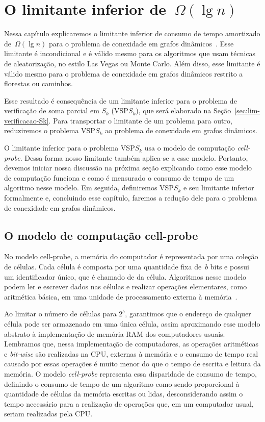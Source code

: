\chapter{O limitante inferior de~$\Omega(\lg n)$}
\label{sec:lim}
Nessa capítulo explicaremos o limitante inferior de consumo de tempo amortizado de~$\Omega(\lg n)$ para o problema de conexidade em grafos dinâmicos~\cite{lowerBoundPatrascu}. Esse limitante é incondicional e é válido mesmo para os algoritmos que usam técnicas de aleatorização, no estilo Las Vegas ou Monte Carlo. Além disso, esse limitante é válido mesmo para o problema de conexidade em grafos dinâmicos restrito a florestas ou caminhos. 

Esse resultado é consequência de um limitante inferior para o problema de verificação de soma parcial em $S_k$ (VSP$S_k$), 
que será elaborado na Seção~\ref{sec:lim-verificacao-Sk}.
Para transportar o limitante de um problema para outro, reduziremos o problema VSP$S_k$ ao problema de conexidade em grafos dinâmicos.

O limitante inferior para o problema VSP$S_k$ usa o modelo de computação \textit{cell-probe}. Dessa forma nosso limitante também aplica-se a esse modelo. Portanto, devemos iniciar nossa discussão na próxima seção explicando como esse modelo de computação funciona e como é mensurado o consumo de tempo de um algoritmo nesse modelo. Em seguida, definiremos VSP$S_k$ e seu limitante inferior formalmente e, concluindo esse capítulo, faremos a redução dele para o problema de conexidade em grafos dinâmicos.

\section{O modelo de computação cell-probe}
\label{sec:lim-cell-probe}
No modelo cell-probe, a memória do computador é representada por uma coleção de células. Cada célula é composta por uma quantidade fixa de~$b$ bits e possui um identificador único, que é chamado de  da célula. Algoritmos nesse modelo podem ler e escrever dados nas células e realizar operações elementares, como aritmética básica, em uma unidade de processamento externa à memória~\cite{Ajtai1988}.

Ao limitar o número de células para $2^b$, garantimos que o endereço de qualquer célula pode ser armazenado em uma única célula, assim aproximando esse modelo abstrato à implementação de memória RAM dos computadores usuais. Lembramos que, nessa implementação de computadores, as operações aritméticas e \textit{bit-wise} são realizadas na CPU, externas à memória e o consumo de tempo real causado por essas operações é muito menor do que o tempo de escrita e leitura da memória. O modelo \textit{cell-probe} representa essa disparidade de consumo de tempo, definindo o consumo de tempo de um algoritmo como sendo proporcional à quantidade de células da memória escritas ou lidas, desconsiderando assim o tempo necessário para a realização de operações que, em um computador usual, seriam realizadas pela CPU.

